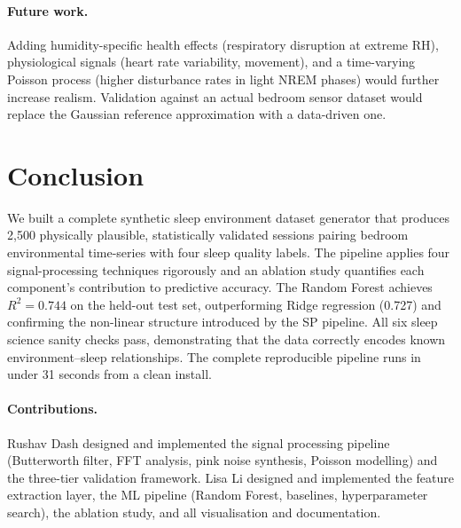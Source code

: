 \documentclass[11pt,a4paper,twocolumn]{article}
\begin{document}
\paragraph{Future work.}
Adding humidity-specific health effects (respiratory disruption at extreme RH),
physiological signals (heart rate variability, movement), and a time-varying
Poisson process (higher disturbance rates in light NREM phases) would further
increase realism.
Validation against an actual bedroom sensor dataset would replace the Gaussian
reference approximation with a data-driven one.

\section{Conclusion}

We built a complete synthetic sleep environment dataset generator that produces
2,500 physically plausible, statistically validated sessions pairing bedroom
environmental time-series with four sleep quality labels.
The pipeline applies four signal-processing techniques rigorously and an
ablation study quantifies each component's contribution to predictive accuracy.
The Random Forest achieves $R^2 = 0.744$ on the held-out test set, outperforming
Ridge regression (0.727) and confirming the non-linear structure introduced by
the SP pipeline.
All six sleep science sanity checks pass, demonstrating that the data correctly
encodes known environment--sleep relationships.
The complete reproducible pipeline runs in under 31 seconds from a clean install.

\paragraph{Contributions.}
Rushav Dash designed and implemented the signal processing pipeline (Butterworth
filter, FFT analysis, pink noise synthesis, Poisson modelling) and the
three-tier validation framework.
Lisa Li designed and implemented the feature extraction layer, the ML pipeline
(Random Forest, baselines, hyperparameter search), the ablation study, and
all visualisation and documentation.
\end{document}
